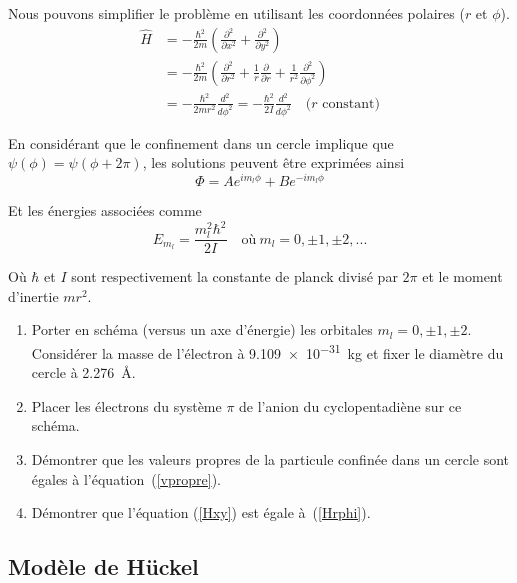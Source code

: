 \documentclass[12pt,letterpaper]{article}
\begin{document}
Nous pouvons simplifier le problème en utilisant les coordonnées polaires ($r$ et $\phi$).
\begin{align}
\label{Hxy} \hat{H} &= -\frac{\hbar^2}{2m} \left( \frac{\partial^2}{\partial x^2} + \frac{\partial^2}{\partial y^2} \right) \\
\label{Hrphi} &= -\frac{\hbar^2}{2m} \left( \frac{\partial^2}{\partial r^2} + \frac{1}{r} \frac{\partial}{\partial r} +  \frac{1}{r^2} \frac{\partial^2}{\partial \phi^2} \right) \\
&= -\frac{\hbar^2}{2mr^2} \frac{d^2}{d \phi^2} = -\frac{\hbar^2}{2I} \frac{d^2}{d \phi^2}\quad\text{(}r\text{ constant)}
\end{align}

En considérant que le confinement dans un cercle implique que $\psi(\phi) = \psi(\phi + 2\pi)$, les solutions peuvent être exprimées ainsi
\begin{equation}
\Phi = A e^{i m_l \phi} + B e^{-i m_l \phi}
\end{equation}

Et les énergies associées comme
\begin{equation}
E_{m_l} = \frac{m_l^2 \hbar^2}{2I}\quad\text{où}\ m_l=0,\pm 1,\pm 2, ...
\label{vpropre}
\end{equation}

Où $\hbar$ et $I$ sont respectivement la constante de planck divisé par $2\pi$ et le moment d'inertie $m r^2$.
\begin{enumerate}
\item Porter en schéma (versus un axe d'énergie) les orbitales $m_l=0,\pm 1, \pm 2$. Considérer la masse de l'électron à \SI{9.109e-31}{\kilo\gram} et fixer le diamètre du cercle à \SI{2.276}{\angstrom}.
\item Placer les électrons du système $\pi$ de l'anion du cyclopentadiène sur ce schéma.
\item Démontrer que les valeurs propres de la particule confinée dans un cercle sont égales à l'équation~(\ref{vpropre}).
\item Démontrer que l'équation (\ref{Hxy}) est égale à~(\ref{Hrphi}).
\end{enumerate}


\subsection*{Modèle de Hückel}
\end{document}
